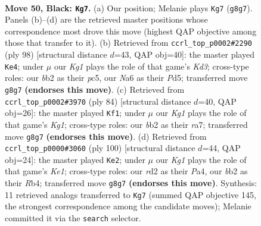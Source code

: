 \documentclass[11pt]{article}
\begin{document}
\clearpage

\begin{figure}[p]\centering
\begin{subfigure}{0.46\textwidth}\centering
\resizebox{\linewidth}{!}{%
\newchessgame
\chessboard[
  setfen={6k1/1p2p3/n5pp/pNr5/P1p2K2/2P2P2/1B1R4/8 b - - 6 50},
  showmover=false,
  pgfstyle=straightmove, color=movearrow, markmove={g8-g7}
]}
\caption{}
\end{subfigure}\hfill
\begin{subfigure}{0.46\textwidth}\centering
\resizebox{\linewidth}{!}{%
\newchessgame
\chessboard[
  setfen={4k3/7R/3p2rn/2pPp1Np/7P/3K2P1/1P6/8 w - - 14 50},
  showmover=false,
  pgfstyle=straightmove, color=movearrow, markmove={d3-e4}
]}
\caption{}
\end{subfigure}
\\[4pt]
\begin{subfigure}{0.46\textwidth}\centering
\resizebox{\linewidth}{!}{%
\newchessgame
\chessboard[
  setfen={8/r7/3p1k1p/PRn3pP/4p3/4N1P1/5P2/6K1 w - - 5 43},
  showmover=false,
  pgfstyle=straightmove, color=movearrow, markmove={g1-f1}
]}
\caption{}
\end{subfigure}\hfill
\begin{subfigure}{0.46\textwidth}\centering
\resizebox{\linewidth}{!}{%
\newchessgame
\chessboard[
  setfen={2n5/8/1p3p2/3p1k1p/PR1P4/2rN1PP1/8/4K3 w - - 8 51},
  showmover=false,
  pgfstyle=straightmove, color=movearrow, markmove={e1-e2}
]}
\caption{}
\end{subfigure}
\caption{\textbf{Move 50, Black: \texttt{Kg7}.} (a) Our position; Melanie plays \texttt{Kg7} (\texttt{g8g7}). Panels (b)--(d) are the retrieved master positions whose correspondence most drove this move (highest QAP objective among those that transfer to it). (b) Retrieved from \texttt{ccrl\_top\_p0002\#2290} (ply 98) [structural distance $d$=43, QAP obj=40]: the master played \texttt{Ke4}; under $\mu$ our \emph{Kg1} plays the role of that game's \emph{Kd3}; cross-type roles: our \emph{b}b2 as their \emph{p}c5, our \emph{N}a6 as their \emph{P}d5; transferred move \texttt{g8g7} \textbf{(endorses this move)}. (c) Retrieved from \texttt{ccrl\_top\_p0002\#3970} (ply 84) [structural distance $d$=40, QAP obj=26]: the master played \texttt{Kf1}; under $\mu$ our \emph{Kg1} plays the role of that game's \emph{Kg1}; cross-type roles: our \emph{b}b2 as their \emph{r}a7; transferred move \texttt{g8g7} \textbf{(endorses this move)}. (d) Retrieved from \texttt{ccrl\_top\_p0000\#3060} (ply 100) [structural distance $d$=44, QAP obj=24]: the master played \texttt{Ke2}; under $\mu$ our \emph{Kg1} plays the role of that game's \emph{Ke1}; cross-type roles: our \emph{r}d2 as their \emph{P}a4, our \emph{b}b2 as their \emph{R}b4; transferred move \texttt{g8g7} \textbf{(endorses this move)}. Synthesis: 11 retrieved analogs transferred to \texttt{Kg7} (summed QAP objective 145, the strongest correspondence among the candidate moves); Melanie committed it via the \texttt{search} selector.}
\label{fig:thought-m99}
\end{figure}
\end{document}
